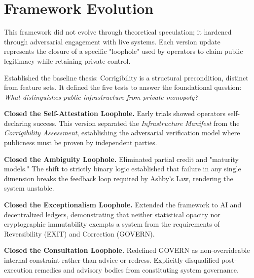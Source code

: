 \section{Framework Evolution}
\label{appendix:evolution}

This framework did not evolve through theoretical speculation; it hardened through adversarial engagement with live systems. Each version update represents the closure of a specific "loophole" used by operators to claim public legitimacy while retaining private control.

\begin{description}[style=nextline, leftmargin=1em, labelindent=0pt]

\item[\textbf{Version 1.0 (Definition)}]
Established the baseline thesis: Corrigibility is a structural precondition, distinct from feature sets. It defined the five tests to answer the foundational question: \textit{What distinguishes public infrastructure from private monopoly?}

\item[\textbf{Version 1.2 (Assessment)}]
\textbf{Closed the Self-Attestation Loophole.} Early trials showed operators self-declaring success. This version separated the \textit{Infrastructure Manifest} from the \textit{Corrigibility Assessment}, establishing the adversarial verification model where publicness must be proven by independent parties.

\item[\textbf{Version 1.4 (Logic)}]
\textbf{Closed the Ambiguity Loophole.} Eliminated partial credit and "maturity models." The shift to strictly binary logic established that failure in any single dimension breaks the feedback loop required by Ashby's Law, rendering the system unstable.

\item[\textbf{Version 1.5 (Invariance)}]
\textbf{Closed the Exceptionalism Loophole.} Extended the framework to AI and decentralized ledgers, demonstrating that neither statistical opacity nor cryptographic immutability exempts a system from the requirements of Reversibility (EXIT) and Correction (GOVERN).

\item[\textbf{Version 1.6 (Constraint)}]
\textbf{Closed the Consultation Loophole.} Redefined GOVERN as non-overrideable internal constraint rather than advice or redress. Explicitly disqualified post-execution remedies and advisory bodies from constituting system governance.


\end{description}
